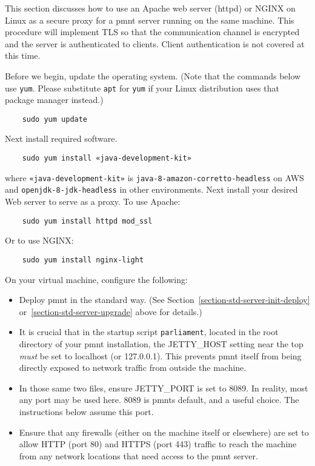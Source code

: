This section discusses how to use an Apache web server (httpd) or NGINX on Linux as a secure proxy for a \ac{pmnt} server running on the same machine.  This procedure will implement TLS so that the communication channel is encrypted and the server is authenticated to clients.  Client authentication is not covered at this time.

Before we begin, update the operating system.  (Note that the commands below use \texttt{yum}.  Please substitute \texttt{apt} for \texttt{yum} if your Linux distribution uses that package manager instead.)

\begin{Verbatim}
	sudo yum update
\end{Verbatim}

Next install required software.

\begin{Verbatim}
	sudo yum install «java-development-kit»
\end{Verbatim}

where \texttt{«java-development-kit»} is \texttt{java-8-amazon-corretto-headless} on AWS and \texttt{openjdk-8-jdk-headless} in other environments.  Next install your desired Web server to serve as a proxy.  To use Apache:

\begin{Verbatim}
	sudo yum install httpd mod_ssl
\end{Verbatim}

Or to use NGINX:

\begin{Verbatim}
	sudo yum install nginx-light
\end{Verbatim}

On your virtual machine, configure the following:

\begin{itemize}
	\item Deploy \ac{pmnt} in the standard way.  (See Section~\ref{section-std-server-init-deploy} or~\ref{section-std-server-upgrade} above for details.)

	\item It is crucial that in the startup script \texttt{parliament}, located in the root directory of your \ac{pmnt} installation, the JETTY\_HOST setting near the top \emph{must} be set to localhost (or 127.0.0.1).  This prevents \ac{pmnt} itself from being directly exposed to network traffic from outside the machine.

	\item In those same two files, ensure JETTY\_PORT is set to 8089.  In reality, most any port may be used here.  8089 is \acp{pmnt} default, and a useful choice.  The instructions below assume this port.

	\item Ensure that any firewalls (either on the machine itself or elsewhere) are set to allow HTTP (port 80) and HTTPS (port 443) traffic to reach the machine from any network locations that need access to the \ac{pmnt} server.
\end{itemize}


